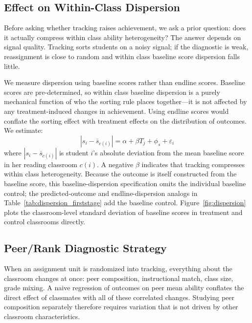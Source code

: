 \documentclass[11pt]{article}
\begin{document}
\subsection{Effect on Within-Class Dispersion}

Before asking whether tracking raises achievement, we ask a prior question: does it actually compress within class ability heterogeneity? The answer depends on signal quality. Tracking sorts students on a noisy signal; if the diagnostic is weak, reassignment is close to random and within class baseline score dispersion falls little.

We measure dispersion using baseline scores rather than endline scores. Baseline scores are pre-determined, so within class baseline dispersion is a purely mechanical function of who the sorting rule places together---it is not affected by any treatment-induced changes in achievement. Using endline scores would conflate the sorting effect with treatment effects on the distribution of outcomes. We estimate:
\begin{equation}
|s_i - \bar{s}_{c(i)}| = \alpha + \beta T_j + \phi_s + \varepsilon_i
\end{equation}
where $|s_i - \bar{s}_{c(i)}|$ is student $i$'s absolute deviation from the mean baseline score in her reading classroom $c(i)$. A negative $\beta$ indicates that tracking compresses within class heterogeneity. Because the outcome is itself constructed from the baseline score, this baseline-dispersion specification omits the individual baseline control; the predicted-outcome and endline-dispersion analogs in Table~\ref{tab:dispersion_firststage} add the baseline control. Figure~\ref{fig:dispersion} plots the classroom-level standard deviation of baseline scores in treatment and control classrooms directly.

\subsection{Peer/Rank Diagnostic Strategy}
\label{sec:bh}

When an assignment unit is randomized into tracking, everything about the classroom changes at once: peer composition, instructional match, class size, grade mixing. A naive regression of outcomes on peer mean ability conflates the direct effect of classmates with all of these correlated changes. Studying peer composition separately therefore requires variation that is not driven by other classroom characteristics.
\end{document}
